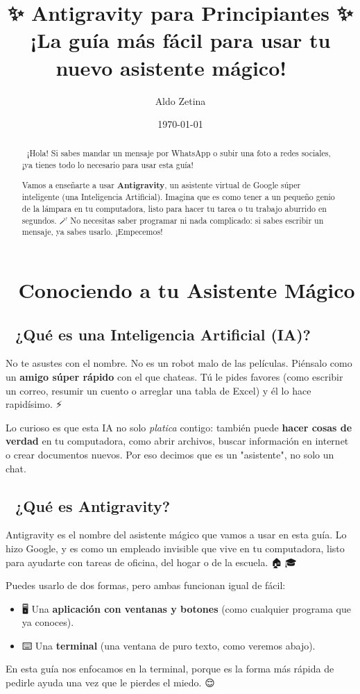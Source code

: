 \documentclass[12pt]{article}
\title{✨ Antigravity para Principiantes ✨\\
\large ¡La guía más fácil para usar tu nuevo asistente mágico! 🧞‍♂️}
\author{Aldo Zetina}
\date{\today}
\begin{document}

\maketitle

\begin{abstract}
🚀 ¡Hola! Si sabes mandar un mensaje por WhatsApp o subir una foto a redes sociales, ¡ya tienes todo lo necesario para usar esta guía!

Vamos a enseñarte a usar \textbf{Antigravity}, un asistente virtual de Google súper inteligente (una Inteligencia Artificial). Imagina que es como tener a un pequeño genio de la lámpara en tu computadora, listo para hacer tu tarea o tu trabajo aburrido en segundos. 🪄 No necesitas saber programar ni nada complicado: si sabes escribir un mensaje, ya sabes usarlo. ¡Empecemos!
\end{abstract}

\tableofcontents
\newpage

\section{👋 Conociendo a tu Asistente Mágico}

\subsection{🤖 ¿Qué es una Inteligencia Artificial (IA)?}
No te asustes con el nombre. No es un robot malo de las películas. Piénsalo como un \textbf{amigo súper rápido} con el que chateas. Tú le pides favores (como escribir un correo, resumir un cuento o arreglar una tabla de Excel) y él lo hace rapidísimo. ⚡

Lo curioso es que esta IA no solo \textit{platica} contigo: también puede \textbf{hacer cosas de verdad} en tu computadora, como abrir archivos, buscar información en internet o crear documentos nuevos. Por eso decimos que es un "asistente", no solo un chat.

\subsection{🧞 ¿Qué es Antigravity?}
Antigravity es el nombre del asistente mágico que vamos a usar en esta guía. Lo hizo Google, y es como un empleado invisible que vive en tu computadora, listo para ayudarte con tareas de oficina, del hogar o de la escuela. 🏠🏢🎓

Puedes usarlo de dos formas, pero ambas funcionan igual de fácil:
\begin{itemize}
    \item 🖥️ Una \textbf{aplicación con ventanas y botones} (como cualquier programa que ya conoces).
    \item ⌨️ Una \textbf{terminal} (una ventana de puro texto, como veremos abajo).
\end{itemize}
En esta guía nos enfocamos en la terminal, porque es la forma más rápida de pedirle ayuda una vez que le pierdes el miedo. 😌
\end{document}
